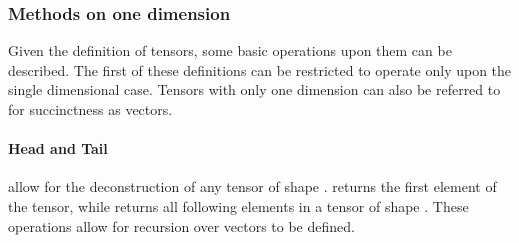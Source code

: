 \subsubsection{Methods on one dimension}
Given the definition of tensors, some basic operations upon them can be described.
The first of these definitions can be restricted to operate only upon the single
dimensional case.
Tensors with only one dimension can also be referred to for succinctness as vectors.

\paragraph{Head and Tail} allow for the deconstruction of any tensor of shape 
. 
 returns the first element of the tensor, while
 returns all following elements in a tensor of shape .
These operations allow for recursion over vectors to be defined.

\begin{code}%
%
\>[2]\AgdaSpace{}%
\AgdaSymbol{:}\AgdaSpace{}%
\AgdaSpace{}%
\AgdaSymbol{(}\AgdaSpace{}%
\AgdaSymbol{(}\AgdaSpace{}%
\AgdaSymbol{))}\AgdaSpace{}%
\AgdaSpace{}%
\AgdaSpace{}%
\<%
\\
%
\>[2]\AgdaSpace{}%
\AgdaSpace{}%
\AgdaSymbol{=}\AgdaSpace{}%
\AgdaSpace{}%
\AgdaSymbol{(}\AgdaSpace{}%
\AgdaSymbol{)}\<%
\\
%
\\[\AgdaEmptyExtraSkip]%
%
\>[2]\AgdaSpace{}%
\AgdaSymbol{:}\AgdaSpace{}%
\AgdaSpace{}%
\AgdaSymbol{(}\AgdaSpace{}%
\AgdaSymbol{(}\AgdaSpace{}%
\AgdaSymbol{))}\AgdaSpace{}%
\AgdaSpace{}%
\AgdaSpace{}%
\AgdaSpace{}%
\AgdaSymbol{(}\AgdaSpace{}%
\AgdaSymbol{)}\AgdaSpace{}%
\<%
\\
%
\>[2]\AgdaSpace{}%
\AgdaSpace{}%
\AgdaSymbol{(}\AgdaSpace{}%
\AgdaSymbol{)}\AgdaSpace{}%
\AgdaSymbol{=}\AgdaSpace{}%
\AgdaSpace{}%
\AgdaSymbol{(}\AgdaSpace{}%
\AgdaSymbol{(}\AgdaSpace{}%
\AgdaSymbol{))}\<%
\end{code}

